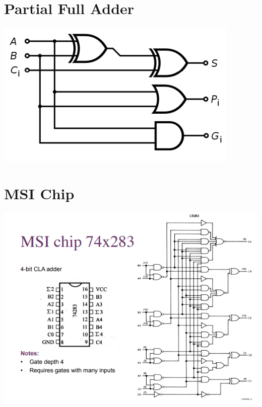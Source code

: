 \documentclass{article}[18pt]
\begin{document}
\section{Partial Full Adder}
\begin{center}
	\includegraphics[scale=0.7]{partial_adder}
\end{center}
\section{MSI Chip}
\begin{center}
	\includegraphics[scale=0.7]{MSI}
\end{center}
\end{document}
